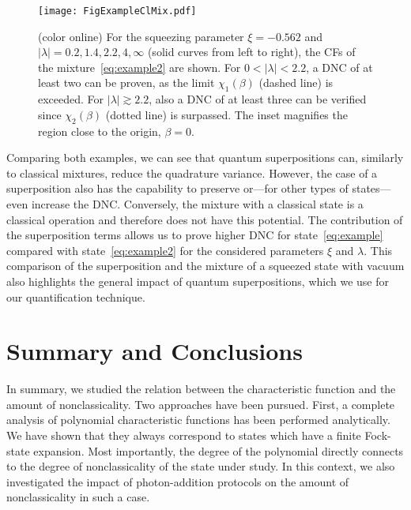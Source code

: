 \documentclass[aps,pra,twocolumn,showpacs,superscriptaddress,10pt]{revtex4-1}
\begin{document}
\begin{figure}[ht]
	 \texttt{[image: FigExampleClMix.pdf]}
	 \caption{(color online)
		  For the squeezing parameter $\xi=-0.562$ and $|\lambda|=0.2,1.4,2.2,4,\infty$ (solid curves from left to right), the CFs of the mixture~\eqref{eq:example2} are shown.
		  For $0<|\lambda|<2.2$, a DNC of at least two can be proven, as the limit $\chi_1(\beta)$ (dashed line) is exceeded.
		  For $|\lambda|\gtrsim 2.2$, also a DNC of at least three can be verified since $\chi_2(\beta)$ (dotted line) is surpassed.
		  The inset magnifies the region close to the origin, $\beta=0$.}\label{fig:examplemix}
\end{figure}
	
	Comparing both examples, we can see that quantum superpositions can, similarly to classical mixtures, reduce the quadrature variance.
	However, the case of a superposition also has the capability to preserve or---for other types of states---even increase the DNC.
	Conversely, the mixture with a classical state is a classical operation and therefore does not have this potential.
	The contribution of the superposition terms allows us to prove higher DNC for state~\eqref{eq:example} compared with state~\eqref{eq:example2} for the considered parameters $\xi$ and $\lambda$.
	This comparison of the superposition and the mixture of a squeezed state with vacuum also highlights the general impact of quantum superpositions, which we use for our quantification technique.

\section{Summary and Conclusions}\label{sec:Conc}
	In summary, we studied the relation between the characteristic function and the amount of nonclassicality.
	Two approaches have been pursued.
	First, a complete analysis of polynomial characteristic functions has been performed analytically.
	We have shown that they always correspond to states which have a finite Fock-state expansion.
	Most importantly, the degree of the polynomial directly connects to the degree of nonclassicality of the state under study.
	In this context, we also investigated the impact of photon-addition protocols on the amount of nonclassicality in such a case.
	
\end{document}
